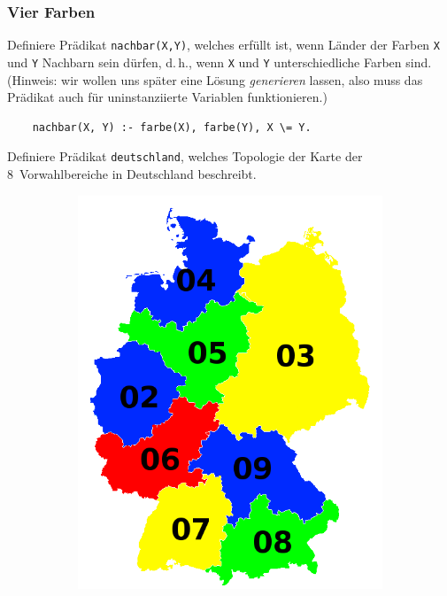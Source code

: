 \documentclass{beamer}
\begin{document}
\begin{frame}[fragile]
  \frametitle{Vier Farben}
  Definiere Prädikat \lstinline{nachbar(X,Y)}, welches erfüllt ist,
  wenn Länder der Farben \lstinline{X} und \lstinline{Y} Nachbarn sein dürfen,
  d.\,h., wenn \lstinline{X} und \lstinline{Y} unterschiedliche Farben sind.
  (Hinweis: wir wollen uns später eine Lösung \emph{generieren} lassen,
  also muss das Prädikat auch für uninstanziierte Variablen funktionieren.)
  \pause
  \begin{lstlisting}
    nachbar(X, Y) :- farbe(X), farbe(Y), X \= Y.
  \end{lstlisting}
\end{frame}

\begin{frame}[fragile]
  Definiere Prädikat \lstinline{deutschland},
  welches Topologie der Karte der 8~Vorwahlbereiche in Deutschland beschreibt.
  \begin{figure}
    \begin{subfigure}{0.3\textwidth}
      \includegraphics[height=0.5\textheight]{tut7-deutschland}

\end{subfigure}
\end{figure}
\end{frame}
\end{document}
